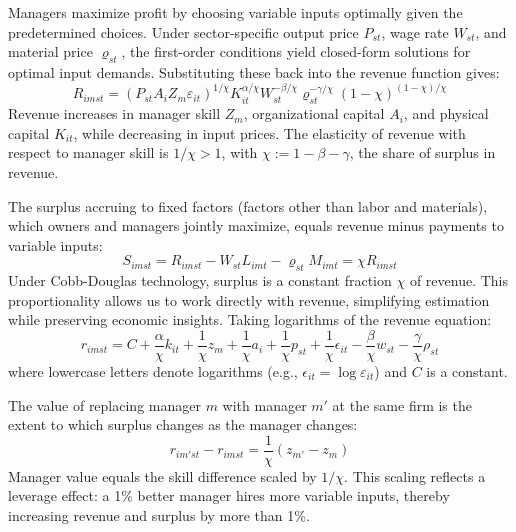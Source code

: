 \documentclass[11pt,a4paper]{article}
\begin{document}
Managers maximize profit by choosing variable inputs optimally given the predetermined choices. Under sector-specific output price $P_{st}$, wage rate $W_{st}$, and material price $\varrho_{st}$, the first-order conditions yield closed-form solutions for optimal input demands. Substituting these back into the revenue function gives:
\begin{equation}\label{eq:revenue}
R_{imst} = (P_{st}A_i Z_m \varepsilon_{it})^{1/\chi}
K_{it}^{\alpha/\chi}
W_{st}^{-\beta/\chi}
\varrho_{st}^{-\gamma/\chi}
(1-\chi)^{(1-\chi)/\chi}
\end{equation}
Revenue increases in manager skill $Z_m$, organizational capital $A_i$, and physical capital $K_{it}$, while decreasing in input prices. The elasticity of revenue with respect to manager skill is $1/\chi > 1$, with $\chi := 1 - \beta - \gamma$, the share of surplus in revenue. 

The surplus accruing to fixed factors (factors other than labor and materials), which owners and managers jointly maximize, equals revenue minus payments to variable inputs:
\begin{equation}\label{eq:surplus}
S_{imst} = R_{imst} - W_{st}L_{imt} - \varrho_{st}M_{imt} = \chi R_{imst}
\end{equation}
Under Cobb-Douglas technology, surplus is a constant fraction $\chi$ of revenue. This proportionality allows us to work directly with revenue, simplifying estimation while preserving economic insights. Taking logarithms of the revenue equation:
\begin{equation}\label{eq:log_revenue}
r_{imst} = C+\frac{\alpha}{\chi} k_{it} + \frac{1}{\chi} z_{m} + \frac{1}{\chi} a_i + \frac{1}{\chi} p_{st} + \frac{1}{\chi}\epsilon_{it} 
- \frac{\beta}{\chi} w_{st} - \frac{\gamma}{\chi} \rho_{st}
\end{equation}
where lowercase letters denote logarithms (e.g., $\epsilon_{it} = \log \varepsilon_{it}$) and $C$ is a constant.

The value of replacing manager $m$ with manager $m'$ at the same firm is the extent to which surplus changes as the manager changes:
\begin{equation}\label{eq:manager_value}
r_{im'st} - r_{imst} = \frac{1}{\chi}(z_{m'} - z_{m})
\end{equation}
Manager value equals the skill difference scaled by $1/\chi$. This scaling reflects a leverage effect: a 1\% better manager hires more variable inputs, thereby increasing revenue and surplus by more than 1\%.
\end{document}
